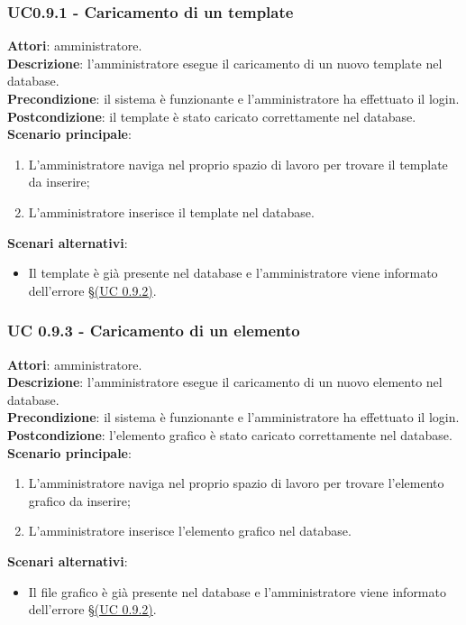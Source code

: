 \subsubsection{UC0.9.1 - Caricamento di un template}{
	\label{uc0.9.1}
	\textbf{Attori}: amministratore. \\
	\textbf{Descrizione}: l'amministratore esegue il caricamento di un nuovo template nel database. \\
	\textbf{Precondizione}: il sistema  è funzionante e l'amministratore ha effettuato il login.	\\
	\textbf{Postcondizione}: il template è stato caricato correttamente nel database.	\\
	\textbf{Scenario principale}:
	\begin{enumerate}
		\item L'amministratore naviga nel proprio spazio di lavoro  per trovare il template da inserire;
		\item L'amministratore inserisce il template nel database.
	\end{enumerate}
	\textbf{Scenari alternativi}:
	\begin{itemize}
		\item Il template è già presente nel database e l'amministratore viene informato dell'errore \S\hyperref[uc0.9.2]{(UC 0.9.2)}.
	\end{itemize}
	}
\subsubsection{UC 0.9.3 - Caricamento di un elemento}{
	\label{uc0.9.3}
	\textbf{Attori}: amministratore. \\
	\textbf{Descrizione}: l'amministratore esegue il caricamento di un nuovo elemento nel database. \\
	\textbf{Precondizione}: il sistema  è funzionante e l'amministratore ha effettuato il login.	\\
	\textbf{Postcondizione}: l'elemento grafico è stato caricato correttamente nel database.	\\
	\textbf{Scenario principale}:
	\begin{enumerate}
		\item L'amministratore naviga nel proprio spazio di lavoro per trovare l'elemento grafico da inserire;
		\item L'amministratore inserisce l'elemento grafico nel database.
	\end{enumerate}
	\textbf{Scenari alternativi}:
	\begin{itemize}
		\item Il file grafico è già presente nel database e l'amministratore viene informato dell'errore \S\hyperref[uc0.9.2]{(UC 0.9.2)}.
	\end{itemize}
	}
